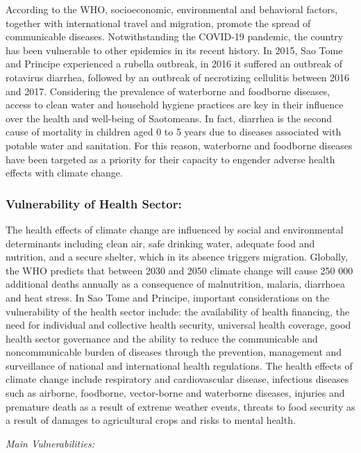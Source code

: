 \documentclass[
]{book}
\begin{document}
According to the WHO, socioeconomic, environmental and behavioral factors, together with international travel and migration, promote the spread of communicable diseases. Notwithstanding the COVID-19 pandemic, the country has been vulnerable to other epidemics in its recent history. In 2015, Sao Tome and Principe experienced a rubella outbreak, in 2016 it suffered an outbreak of rotavirus diarrhea, followed by an outbreak of necrotizing cellulitis between 2016 and 2017. Considering the prevalence of waterborne and foodborne diseases, access to clean water and household hygiene practices are key in their influence over the health and well-being of Saotomeans. In fact, diarrhea is the second cause of mortality in children aged 0 to 5 years due to diseases associated with potable water and sanitation. For this reason, waterborne and foodborne diseases have been targeted as a priority for their capacity to engender adverse health effects with climate change.

\hypertarget{vulnerability-of-health-sector-1}{%
\subsubsection{Vulnerability of Health Sector:}\label{vulnerability-of-health-sector-1}}

The health effects of climate change are influenced by social and environmental determinants including clean air, safe drinking water, adequate food and nutrition, and a secure shelter, which in its absence triggers migration. Globally, the WHO predicts that between 2030 and 2050 climate change will cause 250 000 additional deaths annually as a consequence of malnutrition, malaria, diarrhoea and heat stress. In Sao Tome and Principe, important considerations on the vulnerability of the health sector include: the availability of health financing, the need for individual and collective health security, universal health coverage, good health sector governance and the ability to reduce the communicable and noncommunicable burden of diseases through the prevention, management and surveillance of national and international health regulations. The health effects of climate change include respiratory and cardiovascular disease, infectious diseases such as airborne, foodborne, vector-borne and waterborne diseases, injuries and premature death as a result of extreme weather events, threats to food security as a result of damages to agricultural crops and risks to mental health.

\emph{Main Vulnerabilities:}
\end{document}
